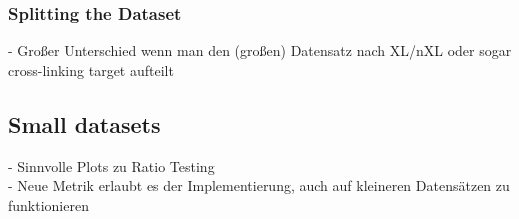 \subsubsection{Splitting the Dataset}
\label{lab:results:splitting}
- Großer Unterschied wenn man den (großen) Datensatz nach XL/nXL oder sogar cross-linking target aufteilt\\

\subsection{Small datasets}
- Sinnvolle Plots zu Ratio Testing\\
- Neue Metrik erlaubt es der Implementierung, auch auf kleineren Datensätzen zu funktionieren
